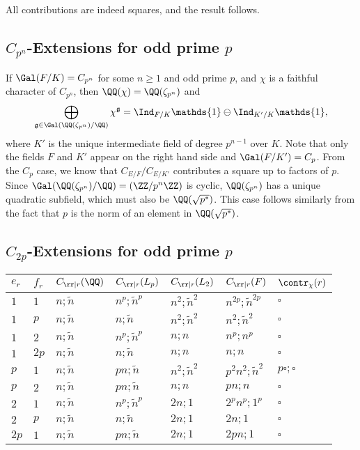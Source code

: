 All contributions are indeed squares, and the result follows.

\subsection*{\texorpdfstring{$C_{p^n}$}{TEXT}-Extensions for odd prime \texorpdfstring{$p$}{TEXT}} \label{case_Cpn}

If $\Gal(F/K)=C_{p^n}$ for some $n\geq 1$ and odd prime $p$, and $\chi$ is a faithful character of $C_{p^n}$, then $\QQ(\chi)=\QQ(\zeta_{p^n})$ and
$$\bigoplus_{\mathfrak{g}\in\Gal(\QQ(\zeta_{p^n})/\QQ)}\chi^{\mathfrak{g}}=\Ind_{F/K}\mathds{1}\ominus\Ind_{K'/K}\mathds{1},$$
where $K'$ is the unique intermediate field of degree $p^{n-1}$ over $K$. Note that only the fields $F$ and $K'$ appear on the right hand side and $\Gal(F/K')=C_p$. From the $C_p$ case, we know that $C_{E/F}/C_{E/K'}$ contributes a square up to factors of $p$. Since $\Gal(\QQ(\zeta_{p^n})/\QQ)=(\ZZ/p^n\ZZ)$ is cyclic, $\QQ(\zeta_{p^n})$ has a unique quadratic subfield, which must also be $\QQ(\sqrt{p^*})$. This case follows similarly from the fact that $p$ is the norm of an element in $\QQ(\sqrt{p^*})$.


\subsection*{\texorpdfstring{$C_{2p}$}{TEXT}-Extensions for odd prime \texorpdfstring{$p$}{TEXT}} \label{case_C2p}

\begin{table}[!ht]
    \centering
    \begin{tabular}{|l|l|l|l|l|l|l|}
    \hline
    $e_r$ & $f_r$  & $C_{\rr\mid r}(\QQ)$ & $C_{\rr\mid r}(L_p)$ & $C_{\rr\mid r}(L_2)$ & $C_{\rr\mid r}(F)$ & $\contr_\chi(r)$ \\ \hline
    $1$ & $1$ & $n;\tilde{n}$ & $n^p;\tilde{n}^p$ & $n^2;\tilde{n}^2$ & $n^{2p};\tilde{n}^{2p}$ & $\square$ \\ \hline
    $1$ & $p$ & $n;\tilde{n}$ & $n;\tilde{n}$ & $n^2;\tilde{n}^2$ & $n^2;\tilde{n}^2$ & $\square$ \\ \hline
    $1$ & $2$ & $n;\tilde{n}$ & $n^p;\tilde{n}^p$ & $n;n$ & $n^p;n^p$ & $\square$ \\ \hline
    $1$ & $2p$ & $n;\tilde{n}$ & $n;\tilde{n}$ & $n;n$ & $n;n$ & $\square$ \\ \hline
    $p$ & $1$ & $n;\tilde{n}$ & $pn;\tilde{n}$ & $n^2;\tilde{n}^2$ & $p^2n^2;\tilde{n}^2$ & $p\square;\square$ \\ \hline
    $p$ & $2$ & $n;\tilde{n}$ & $pn;\tilde{n}$ & $n;n$ & $pn;n$ & $\square$ \\ \hline
    $2$ & $1$ & $n;\tilde{n}$ & $n^p;\tilde{n}^p$ & $2n;1$ & $2^pn^p;1^p$ & $\square$ \\ \hline
    $2$ & $p$ & $n;\tilde{n}$ & $n;\tilde{n}$ & $2n;1$ & $2n;1$ & $\square$ \\ \hline
    $2p$ & $1$ & $n;\tilde{n}$ & $pn;\tilde{n}$ & $2n;1$ & $2pn;1$ & $\square$ \\ \hline
    \end{tabular}
\end{table}

